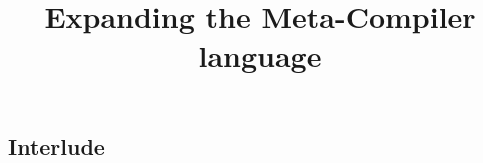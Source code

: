 


\begin{multicols}{3}
\title{Expanding the Meta-Compiler language}
\author{\writer}








% 

\chapter{Interlude}



\end{multicols}
